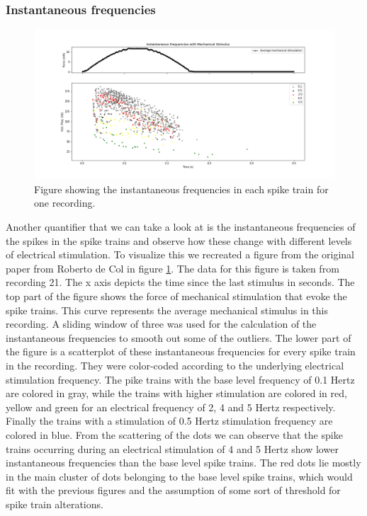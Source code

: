 \subsubsection{Instantaneous frequencies}
\begin{figure}
	\includegraphics[width = \textwidth]{src/pic/11_12_13U1b_inst_freqs}
	\caption{Figure showing the instantaneous frequencies in each spike train for one recording.}
	\label{fig:inst_freqs}
\end{figure}
Another quantifier that we can take a look at is the instantaneous frequencies of the spikes in the spike trains and observe how these change with different levels of electrical stimulation. To visualize this we recreated a figure from the original paper from Roberto de Col in figure \ref{fig:inst_freqs}. The data for this figure is taken from recording 21. The x axis depicts the time since the last stimulus in seconds. The top part of the figure shows the force of mechanical stimulation that evoke the spike trains. This curve represents the average mechanical stimulus in this recording. A sliding window of three was used for the calculation of the instantaneous frequencies to smooth out some of the outliers. The lower part of the figure is a scatterplot of these instantaneous frequencies for every spike train in the recording. They were color-coded according to the underlying electrical stimulation frequency. The pike trains with the base level frequency of 0.1 Hertz are colored in gray, while the trains with higher stimulation are colored in red, yellow and green for an electrical frequency of 2, 4 and 5 Hertz respectively. Finally the trains with a stimulation of 0.5 Hertz stimulation frequency are colored in blue. From the scattering of the dots we can observe that the spike trains occurring during an electrical stimulation of 4 and 5 Hertz show lower instantaneous frequencies than the base level spike trains. The red dots lie mostly in the main cluster of dots belonging to the base level spike trains, which would fit with the previous figures and the assumption of some sort of threshold for spike train alterations.

